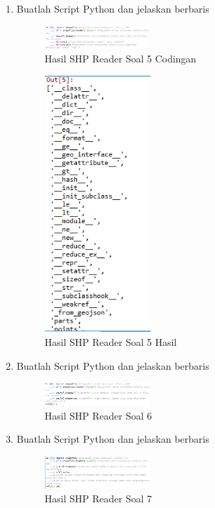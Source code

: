 \begin{enumerate}
    \item Buatlah Script Python dan jelaskan berbaris
    
    \hfill\break
    \begin{figure}[H]
		\includegraphics[width=4cm]{figures/1174027/3/soal5.png}
		\centering
		\caption{Hasil SHP Reader Soal 5 Codingan}
    \end{figure}

    \hfill\break
    \begin{figure}[H]
		\includegraphics[width=4cm]{figures/1174027/3/soal5_out.png}
		\centering
		\caption{Hasil SHP Reader Soal 5 Hasil}
    \end{figure}
    
    \item Buatlah Script Python dan jelaskan berbaris
    
    \hfill\break
    \begin{figure}[H]
		\includegraphics[width=4cm]{figures/1174027/3/soal6.png}
		\centering
		\caption{Hasil SHP Reader Soal 6}
    \end{figure}

    \item Buatlah Script Python dan jelaskan berbaris
    
    \hfill\break
    \begin{figure}[H]
		\includegraphics[width=4cm]{figures/1174027/3/soal7.png}
		\centering
		\caption{Hasil SHP Reader Soal 7}
    \end{figure}


\end{enumerate}
